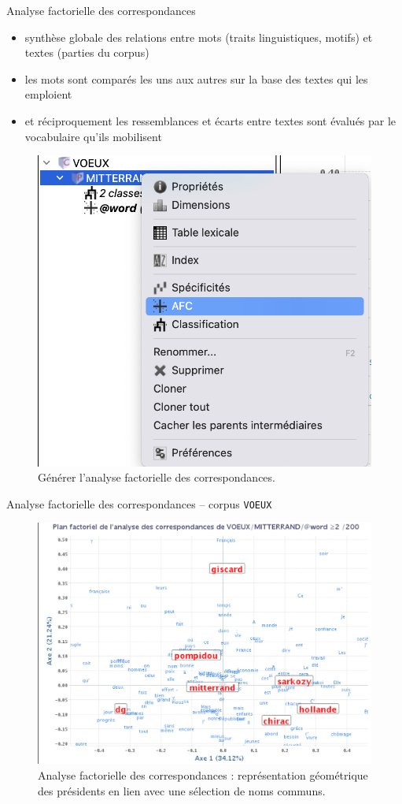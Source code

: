 \documentclass[xetex,xcolor={table,usenames,dvipsnames}]{beamer}
\begin{document}
\begin{frame}{Analyse factorielle des correspondances \citep{benzecri1973analyse}}
	\begin{itemize}
		\item synthèse globale des relations entre
		mots (traits linguistiques, motifs) et textes (parties du
		corpus) 
		\item les mots sont comparés les uns aux autres sur la base des textes qui les emploient
		\item et réciproquement les ressemblances et écarts entre textes sont évalués par le vocabulaire qu’ils
		mobilisent
	\end{itemize}
			\begin{figure}[h] %
		\centering
		\includegraphics[width=.3\linewidth]{img/generer_afc.png}
		\caption{Générer l'analyse factorielle des correspondances.}
		\label{fig:ling_out_TAL}
	\end{figure}
\end{frame}
\begin{frame}{Analyse factorielle des correspondances -- corpus \texttt{VOEUX}}
		\begin{figure}[h] %
		\centering
		\includegraphics[width=.8\linewidth]{img/afc.png}
		\caption{Analyse factorielle des correspondances : représentation géométrique des présidents en lien avec une sélection de noms communs.}
		\label{fig:ling_out_TAL}
	\end{figure}
\end{frame}
\end{document}
